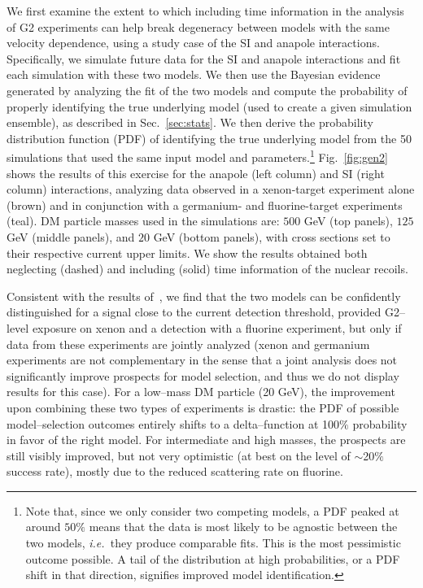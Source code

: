 \documentclass[11pt]{article}
\newcommand{\ie}{{\it i.e.~}}  \newcommand{\eg}{{\it e.g.~}}
\newcommand{\Sec}[1]{Sec.~\ref{#1}} \newcommand{\Secs}[2]{Secs.~\ref{#1} and \ref{#2}} \newcommand{\Secm}[2]{Secs.~\ref{#1} through \ref{#2}}
\newcommand{\Fig}[1]{Fig.~\ref{#1}} \newcommand{\Figs}[2]{Figs.~\ref{#1} and \ref{#2}}
\begin{document}
We first examine the extent to which including time information in the analysis of G2 experiments can help break degeneracy between models with the same velocity dependence, using a study case of the SI and anapole interactions. Specifically, we simulate future data for the SI and anapole interactions and fit each simulation with these two models. We then use the Bayesian evidence generated by analyzing the fit of the two models and compute the probability of properly identifying the true underlying model (used to create a given simulation ensemble), as described in \Sec{sec:stats}. We then derive the probability distribution function (PDF) of identifying the true underlying model from the 50 simulations that used the same input model and parameters.\footnote{Note that, since we only consider two competing models, a PDF peaked at around $50\%$ means that the data is most likely to be agnostic between the two models, \ie they produce comparable fits. This is the most pessimistic outcome possible. A tail of the distribution at high probabilities, or a PDF shift in that direction, signifies improved model identification.} \Fig{fig:gen2} shows the results of this exercise for the anapole (left column) and SI (right column) interactions, analyzing data observed in a xenon-target experiment alone (brown) and in conjunction with a germanium- and fluorine-target experiments (teal). DM particle masses used in the simulations are: $500$ GeV (top panels), $125$ GeV (middle panels), and $20$ GeV (bottom panels), with cross sections set to their respective current upper limits. We show the results obtained both neglecting (dashed) and including (solid) time information of the nuclear recoils. 

Consistent with the results of~\cite{Gluscevic:2015sqa}, we find that the two models can be confidently distinguished for a signal close to the current detection threshold, provided G2--level exposure on xenon and a detection with a fluorine experiment, but only if data from these experiments are jointly analyzed (xenon and germanium experiments are not complementary in the sense that a joint analysis does not significantly improve prospects for model selection, and thus we do not display results for this case). For a low--mass DM particle (20 GeV), the improvement upon combining these two types of experiments is drastic: the PDF of possible model--selection outcomes entirely shifts to a delta--function at 100$\%$ probability in favor of the right model. For intermediate and high masses, the prospects are still visibly improved, but not very optimistic (at best on the level of $\sim$20$\%$ success rate), mostly due to the reduced scattering rate on fluorine.  
\end{document}

